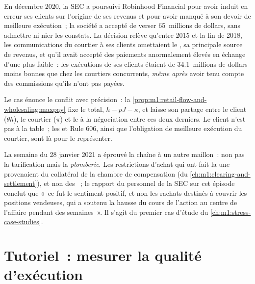 \begin{example}\label{ex:m1:retail-flow-and-wholesaling:case}
En décembre 2020, la SEC a poursuivi Robinhood Financial pour avoir induit en erreur
ses clients sur l'origine de ses revenus et pour avoir manqué à son devoir de meilleure
exécution~; la société a accepté de verser 65~millions de dollars, sans admettre ni nier
les constats. La décision relève qu'entre 2015 et la fin de 2018, les communications du courtier à ses clients
omettaient le , sa principale source
de revenus, et qu'il avait accepté des paiements anormalement élevés en échange d'une
 plus faible~: les exécutions de ses clients étaient de 34.1~millions de dollars moins bonnes
que chez les courtiers concurrents, \emph{même après} avoir tenu compte des
commissions qu'ils n'ont pas payées.
\end{example}

Le cas énonce le conflit avec précision~: la \cref{prop:m1:retail-flow-and-wholesaling:maxpay}
fixe le total, $h - pJ - \kappa$, et laisse son partage entre le
client ($\theta h$), le courtier ($\pi$) et le  à la négociation
entre ces deux derniers. Le client n'est pas à la table~; les
 et Rule 606, ainsi que l'obligation de meilleure exécution du courtier, sont là pour le représenter.

La semaine du 28 janvier 2021 a éprouvé la chaîne à un autre maillon~: non
pas la tarification mais la \emph{plomberie}. Les restrictions d'achat qui ont fait la une
provenaient du collatéral de la chambre de compensation (du \cref{ch:m1:clearing-and-settlement}),
et non des ~; le rapport du personnel de la SEC sur cet épisode
conclut que «~ce fut le sentiment positif, et non les rachats destinés à couvrir les positions vendeuses, qui a soutenu
la hausse du cours de l'action au centre de l'affaire pendant des semaines~».
Il s'agit du premier cas d'étude du \cref{ch:m1:stress-case-studies}.

\section{Tutoriel~: mesurer la qualité d'exécution}\label{tut:m1:retail-flow-and-wholesaling:execq}

